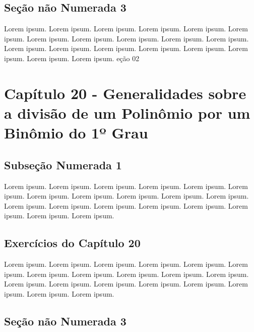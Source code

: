 \documentclass[
]{book}
\begin{document}
\hypertarget{seuxe7uxe3o-nuxe3o-numerada-3}{%
\subsection*{Seção não Numerada 3}\label{seuxe7uxe3o-nuxe3o-numerada-3}}

Lorem ipsum. Lorem ipsum. Lorem ipsum. Lorem ipsum. Lorem ipsum. Lorem ipsum. Lorem ipsum. Lorem ipsum. Lorem ipsum. Lorem ipsum. Lorem ipsum. Lorem ipsum. Lorem ipsum. Lorem ipsum. Lorem ipsum. Lorem ipsum. Lorem ipsum. Lorem ipsum. Lorem ipsum.
eção 02

\hypertarget{capuxedtulo-20---generalidades-sobre-a-divisuxe3o-de-um-polinuxf4mio-por-um-binuxf4mio-do-1uxba-grau}{%
\section{Capítulo 20 - Generalidades sobre a divisão de um Polinômio por um Binômio do 1º Grau}\label{capuxedtulo-20---generalidades-sobre-a-divisuxe3o-de-um-polinuxf4mio-por-um-binuxf4mio-do-1uxba-grau}}

\hypertarget{subseuxe7uxe3o-numerada-1-1}{%
\subsection{Subseção Numerada 1}\label{subseuxe7uxe3o-numerada-1-1}}

Lorem ipsum. Lorem ipsum. Lorem ipsum. Lorem ipsum. Lorem ipsum. Lorem ipsum. Lorem ipsum. Lorem ipsum. Lorem ipsum. Lorem ipsum. Lorem ipsum. Lorem ipsum. Lorem ipsum. Lorem ipsum. Lorem ipsum. Lorem ipsum. Lorem ipsum. Lorem ipsum. Lorem ipsum.

\hypertarget{exercuxedcios-do-capuxedtulo-20}{%
\subsection{Exercícios do Capítulo 20}\label{exercuxedcios-do-capuxedtulo-20}}

Lorem ipsum. Lorem ipsum. Lorem ipsum. Lorem ipsum. Lorem ipsum. Lorem ipsum. Lorem ipsum. Lorem ipsum. Lorem ipsum. Lorem ipsum. Lorem ipsum. Lorem ipsum. Lorem ipsum. Lorem ipsum. Lorem ipsum. Lorem ipsum. Lorem ipsum. Lorem ipsum. Lorem ipsum.

\hypertarget{seuxe7uxe3o-nuxe3o-numerada-3-1}{%
\subsection*{Seção não Numerada 3}\label{seuxe7uxe3o-nuxe3o-numerada-3-1}}
\end{document}

